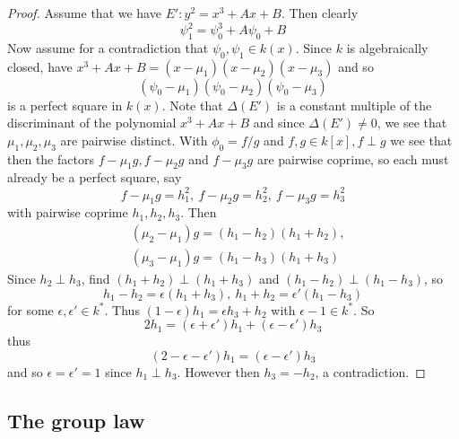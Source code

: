 \documentclass{scrartcl}
\theoremstyle{definition}
\begin{document}
\begin{proof}
    Assume that we have $E': y^2 = x^3 + Ax + B$.
    Then clearly
    \begin{equation*}
        \psi_1^2 = \psi_0^3 + A\psi_0 + B
    \end{equation*}
    Now assume for a contradiction that $\psi_0, \psi_1 \in k(x)$.
    Since $k$ is algebraically closed, have $x^3 + Ax + B = (x - \mu_1)(x - \mu_2)(x - \mu_3)$ and so
    \begin{equation*}
        (\psi_0 - \mu_1)(\psi_0 - \mu_2)(\psi_0 - \mu_3)
    \end{equation*}
    is a perfect square in $k(x)$.
    Note that $\Delta(E')$ is a constant multiple of the discriminant of the polynomial $x^3 + Ax + B$ and since $\Delta(E') \neq 0$, we see that $\mu_1, \mu_2, \mu_3$ are pairwise distinct.
    With $\phi_0 = f/g$ and $f, g \in k[x], f \perp g$ we see that then the factors $f - \mu_1 g, f - \mu_2 g$ and $f - \mu_3 g$ are pairwise coprime, so each must already be a perfect square, say
    \begin{equation*}
        f - \mu_1 g = h_1^2, \ f - \mu_2 g = h_2^2, \ f - \mu_3 g = h_3^2
    \end{equation*}
    with pairwise coprime $h_1, h_2, h_3$. Then
    \begin{align*}
        &(\mu_2 - \mu_1) g = (h_1 - h_2)(h_1 + h_2), \\
        &(\mu_3 - \mu_1) g = (h_1 - h_3)(h_1 + h_3)
    \end{align*}
    Since $h_2 \perp h_3$, find $(h_1 + h_2) \perp (h_1 + h_3)$ and $(h_1 - h_2) \perp (h_1 - h_3)$, so
    \begin{equation*}
        h_1 - h_2 = \epsilon(h_1 + h_3), \ h_1 + h_2 = \epsilon'(h_1 - h_3)
    \end{equation*}
    for some $\epsilon, \epsilon' \in k^*$. Thus $(1 - \epsilon)h_1 = \epsilon h_3 + h_2$ with $\epsilon - 1 \in k^*$.
    So
    \begin{equation*}
        2h_1 = (\epsilon + \epsilon')h_1 + (\epsilon - \epsilon')h_3
    \end{equation*}
    thus
    \begin{equation*}
        (2 - \epsilon - \epsilon')h_1 = (\epsilon - \epsilon')h_3
    \end{equation*}
    and so $\epsilon = \epsilon' = 1$ since $h_1 \perp h_3$. 
    However then $h_3 = -h_2$, a contradiction.
\end{proof}

\subsection{The group law}
\end{document}
